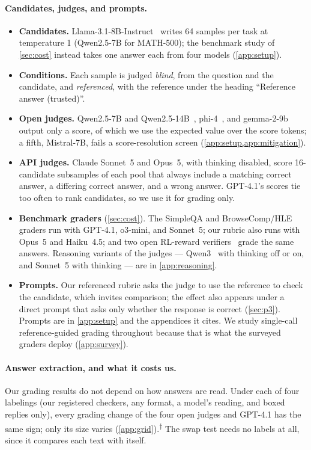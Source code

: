 \documentclass{article}
\newcommand{\ph}{\textsuperscript{$\dagger$}}
\begin{document}
\paragraph{Candidates, judges, and prompts.}
\begin{itemize}[leftmargin=1.2em,itemsep=0pt,topsep=0pt]
\item \textbf{Candidates.} Llama-3.1-8B-Instruct~\citep{grattafiori2024llama3} writes 64 samples per task at temperature 1 (Qwen2.5-7B for MATH-500); the benchmark study of \cref{sec:cost} instead takes one answer each from four models (\cref{app:setup}).
\item \textbf{Conditions.} Each sample is judged \emph{blind}, from the question and the candidate, and \emph{referenced}, with the reference under the heading ``Reference answer (trusted)''.
\item \textbf{Open judges.} Qwen2.5-7B and Qwen2.5-14B~\citep{yang2024qwen25}, phi-4~\citep{abdin2024phi4}, and gemma-2-9b~\citep{riviere2024gemma2} output only a score, of which we use the expected value over the score tokens; a fifth, Mistral-7B, fails a score-resolution screen (\cref{app:setup,app:mitigation}).
\item \textbf{API judges.} Claude Sonnet~5 and Opus~5, with thinking disabled, score 16-candidate subsamples of each pool that always include a matching correct answer, a differing correct answer, and a wrong answer. GPT-4.1's scores tie too often to rank candidates, so we use it for grading only.
\item \textbf{Benchmark graders} (\cref{sec:cost}). The SimpleQA and BrowseComp/HLE graders run with GPT-4.1, o3-mini, and Sonnet~5; our rubric also runs with Opus~5 and Haiku~4.5; and two open RL-reward verifiers~\citep{ma2025generalreasoner,liu2025compassverifier} grade the same answers. Reasoning variants of the judges --- Qwen3~\citep{yang2025qwen3} with thinking off or on, and Sonnet~5 with thinking --- are in \cref{app:reasoning}.
\item \textbf{Prompts.} Our referenced rubric asks the judge to use the reference to check the candidate, which invites comparison; the effect also appears under a direct prompt that asks only whether the response is correct (\cref{sec:p3}). Prompts are in \cref{app:setup} and the appendices it cites. We study single-call reference-guided grading throughout because that is what the surveyed graders deploy (\cref{app:survey}).
\end{itemize}

\paragraph{Answer extraction, and what it costs us.}
Our grading results do not depend on how answers are read. Under each of four labelings (our registered checkers, any format, a model's reading, and boxed replies only), every grading change of the four open judges and GPT-4.1 has the same sign; only its size varies (\cref{app:grid}).\ph{} The swap test needs no labels at all, since it compares each text with itself.
\end{document}
